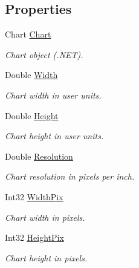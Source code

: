 \subsection*{Properties}
\begin{DoxyCompactItemize}
\item 
Chart \hyperlink{class_pdf_file_writer_1_1_pdf_chart_aa08931d631c7d005f289c4960423a305}{Chart}
\begin{DoxyCompactList}\small\item\em Chart object (.N\+ET). \end{DoxyCompactList}\item 
Double \hyperlink{class_pdf_file_writer_1_1_pdf_chart_a2bbac5f243d2593a15a68c17283765de}{Width}
\begin{DoxyCompactList}\small\item\em Chart width in user units. \end{DoxyCompactList}\item 
Double \hyperlink{class_pdf_file_writer_1_1_pdf_chart_a4216487a4cf01f891007685a128bd328}{Height}
\begin{DoxyCompactList}\small\item\em Chart height in user units. \end{DoxyCompactList}\item 
Double \hyperlink{class_pdf_file_writer_1_1_pdf_chart_aa948dfd08bf85fb6d1e5d1376d18d922}{Resolution}
\begin{DoxyCompactList}\small\item\em Chart resolution in pixels per inch. \end{DoxyCompactList}\item 
Int32 \hyperlink{class_pdf_file_writer_1_1_pdf_chart_ace6927c84e4d0a2fee7b5afd9536bec4}{Width\+Pix}
\begin{DoxyCompactList}\small\item\em Chart width in pixels. \end{DoxyCompactList}\item 
Int32 \hyperlink{class_pdf_file_writer_1_1_pdf_chart_a69b29f5c270465945d945b120b56b4e9}{Height\+Pix}
\begin{DoxyCompactList}\small\item\em Chart height in pixels. \end{DoxyCompactList}\end{DoxyCompactItemize}


